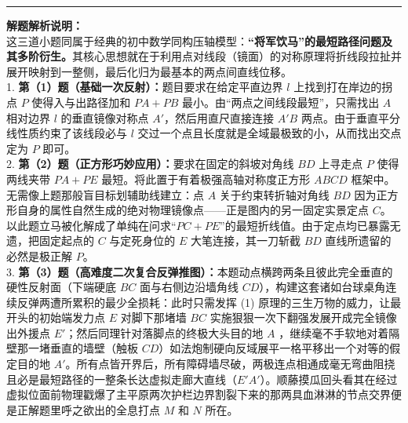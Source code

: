 \documentclass[12pt, a4paper]{ctexrep}
\begin{document}
\vspace{0.6cm}
\hrule
\vspace{0.4cm}

{\small\color{gray}
\textbf{解题解析说明：}\\
这三道小题同属于经典的初中数学同构压轴模型：\textbf{“将军饮马”的最短路径问题及其多阶衍生。}其核心思想就在于利用点对线段（镜面）的对称原理将折线段拉扯并展开映射到一整侧，最后化归为最基本的两点间直线位移。\\
1. \textbf{第（1）题（基础一次反射）：}题目要求在给定平直边界 $l$ 上找到打在岸边的拐点 $P$ 使得入与出路径加和 $PA+PB$ 最小。由“两点之间线段最短”，只需找出 $A$ 相对边界 $l$ 的垂直镜像对称点 $A'$，然后用直尺直接连接 $A'B$ 两点。由于垂直平分线性质约束了该线段必与 $l$ 交过一个点且长度就是全域最极致的小，从而找出交点定为 $P$ 即可。\\
2. \textbf{第（2）题（正方形巧妙应用）：}要求在固定的斜坡对角线 $BD$ 上寻走点 $P$ 使得两线夹带 $PA+PE$ 最短。将此置于有着极强高轴对称度正方形 $ABCD$ 框架中。无需像上题那般盲目标划辅助线建立：点 $A$ 关于约束转折轴对角线 $BD$ 因为正方形自身的属性自然生成的绝对物理镜像点——正是图内的另一固定实景定点 $C$。以此题立马被化解成了单纯在问求“$PC+PE$”的最短折线值。由于定点均已暴露无遗，把固定起点的 $C$ 与定死身位的 $E$ 大笔连接，其一刀斩截 $BD$ 直线所遗留的必然是极正解 $P$。\\
3. \textbf{第（3）题（高难度二次复合反弹推图）：}本题动点横跨两条且彼此完全垂直的硬性反射面（下端硬底 $BC$ 面与右侧边沿墙角线 $CD$），构建这套诸如台球桌角连续反弹两遭所累积的最少全损耗：此时只需发挥 (1) 原理的三生万物的威力，让最开头的初始端发力点 $E$ 对脚下那堵墙 $BC$ 实施狠狠一次下翻强发展开成完全镜像出外援点 $E'$；然后同理针对落脚点的终极大头目的地 $A$ ，继续毫不手软地对着隔壁那一堵垂直的墙壁（触板 $CD$）如法炮制硬向反域展平一格平移出一个对等的假定目的地 $A'$。所有点皆开界后，所有障碍墙尽破，两极连点相通成毫无弯曲阻挠且必是最短路径的一整条长达虚拟走廊大直线（$E'A'$）。顺藤摸瓜回头看其在经过虚拟位面前物理戳爆了主平原两次护栏边界割裂下来的那两具血淋淋的节点交界便是正解题里呼之欲出的全息打点 $M$ 和 $N$ 所在。
}

\vspace{0.6cm}
\end{document}
